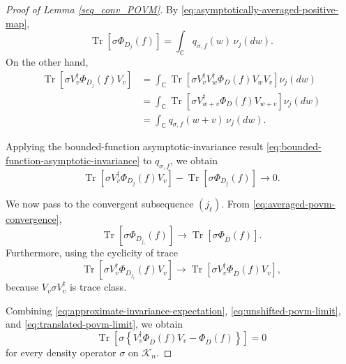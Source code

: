 \documentclass{article}
\theoremstyle{named}
\theoremstyle{named1}
\newcommand{\Tr}{\operatorname{Tr}}
\newcommand{\bbC}{\mathbb C}
\theoremstyle{plain}
\theoremstyle{remark}
\begin{document}
\begin{proof}[Proof of Lemma \ref{seq_conv_POVM}]
By \eqref{eq:asymptotically-averaged-positive-map},
\begin{equation}
    \Tr\!\left[
        \sigma\Phi_{D_j}(f)
    \right]
    =
    \int_{\bbC}
        q_{\sigma,f}(w)\,
        \nu_j(dw).
    \label{eq:unshifted-scalar-average}
\end{equation}
On the other hand,
\begin{align}
\Tr\!\left[
        \sigma
        V_v^\dagger\Phi_{D_j}(f)V_v
    \right]
&=
    \int_{\bbC}
        \Tr\!\left[
            \sigma
            V_v^\dagger V_w^\dagger
            \Phi_D(f)
            V_wV_v
        \right]
        \nu_j(dw)\nonumber\\
&=\int_{\bbC}
        \Tr\!\left[
            \sigma
            V_{w+v}^\dagger\Phi_D(f)V_{w+v}
        \right]
        \nu_j(dw)\nonumber\\
&=
    \int_{\bbC}
        q_{\sigma,f}(w+v)\,
        \nu_j(dw).
    \label{eq:translated-scalar-average}
\end{align}


Applying the bounded-function asymptotic-invariance result
\eqref{eq:bounded-function-asymptotic-invariance} to
\(q_{\sigma,f}\), we obtain
\begin{equation}
    \Tr\!\left[
        \sigma
        V_v^\dagger\Phi_{D_j}(f)V_v
    \right]
    -
    \Tr\!\left[
        \sigma\Phi_{D_j}(f)
    \right]
    \rightarrow0.
    \label{eq:approximate-invariance-expectation}
\end{equation}

We now pass to the convergent subsequence \((j_\ell)\). From
\eqref{eq:averaged-povm-convergence},
\begin{equation}
    \Tr\!\left[
        \sigma\Phi_{D_{j_\ell}}(f)
    \right]
    \rightarrow
    \Tr\!\left[
        \sigma\Phi_{\overline D}(f)
    \right].
    \label{eq:unshifted-povm-limit}
\end{equation}
Furthermore, using the cyclicity of trace
\begin{equation}
\Tr\!\left[
        \sigma
        V_v^\dagger
        \Phi_{D_{j_\ell}}(f)
        V_v
    \right]
\rightarrow
    \Tr\!\left[
        \sigma
        V_v^\dagger
        \Phi_{\overline D}(f)
        V_v
    \right],
    \label{eq:translated-povm-limit}
\end{equation}
because \(V_v\sigma V_v^\dagger\) is trace class.

Combining
\eqref{eq:approximate-invariance-expectation},
\eqref{eq:unshifted-povm-limit}, and
\eqref{eq:translated-povm-limit}, we obtain
\begin{equation}
    \Tr\!\left[
        \sigma
        \left\{
            V_v^\dagger
            \Phi_{\overline D}(f)
            V_v
            -
            \Phi_{\overline D}(f)
        \right\}
    \right]
    =
    0
    \label{eq:invariance-against-density-operators}
\end{equation}
for every density operator \(\sigma\) on \(\mathcal K_n\).


\end{proof}
\end{document}
